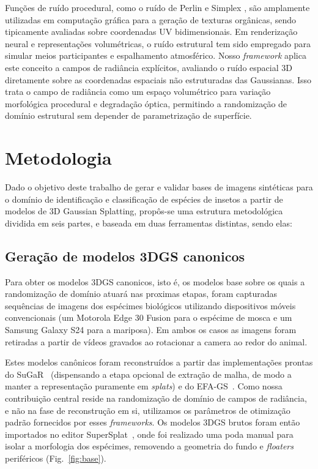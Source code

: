 \documentclass[a4paper,12pt]{article}
\begin{document}
{Funções de ruído procedural, como o ruído de Perlin e Simplex \cite{perlin1985image}, são amplamente utilizadas em computação gráfica para a geração de texturas orgânicas, sendo tipicamente avaliadas sobre coordenadas UV bidimensionais. Em renderização neural e representações volumétricas, o ruído estrutural tem sido empregado para simular meios participantes e espalhamento atmosférico. Nosso \textit{framework} aplica este conceito a campos de radiância explícitos, avaliando o ruído espacial 3D diretamente sobre as coordenadas espaciais não estruturadas das Gaussianas. Isso trata o campo de radiância como um espaço volumétrico para variação morfológica procedural e degradação óptica, permitindo a randomização de domínio estrutural sem depender de parametrização de superfície.

 

\section{Metodologia}
Dado o objetivo deste trabalho de gerar e validar bases de imagens sintéticas para o domínio de identificação e classificação de espécies de insetos a partir de modelos de 3D Gaussian Splatting, propôs-se uma estrutura metodológica dividida em seis partes, e baseada em duas ferramentas distintas, sendo elas:

\subsection{Geração de modelos 3DGS canonicos}
Para obter os modelos 3DGS canonicos, isto é, os modelos base sobre os quais a 
randomização de domínio atuará nas proximas etapas, foram capturadas sequências 
de imagens dos espécimes biológicos utilizando dispositivos
móveis convencionais (um Motorola Edge 30 Fusion para o espécime de mosca e um
Samsung Galaxy S24 para a mariposa). Em ambos os casos as imagens foram retiradas 
a partir de vídeos gravados ao rotacionar a camera ao redor do animal.

Estes modelos canônicos foram reconstruídos
a partir das implementações prontas do SuGaR~\cite{guedon2024} (dispensando a etapa
opcional de extração de malha, de modo a manter a representação puramente em
\textit{splats}) e do EFA-GS~\cite{wang2025}. Como nossa contribuição central
reside na randomização de domínio de campos de radiância, e não na fase de
reconstrução em si, utilizamos os parâmetros de otimização padrão fornecidos por
esses \textit{frameworks}. Os modelos 3DGS brutos foram então importados no
editor SuperSplat~\cite{supersplat}, onde foi realizado uma poda
manual para isolar a morfologia dos espécimes, removendo a geometria do fundo e
\textit{floaters} periféricos (Fig.~\ref{fig:base}).

}
\end{document}
